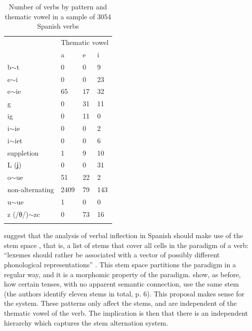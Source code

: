 \begin{table}
  \centering
  \begin{tabular}{llll}
    \lsptoprule
                    & \multicolumn{3}{c}{Thematic vowel} \\
                    & a    & e  & i                      \\
    \midrule
    b$\sim$t       & 0    & 0  & 9                      \\
    e$\sim$i        & 0    & 0  & 23                     \\
    e$\sim$ie       & 65   & 17 & 32                     \\
    g               & 0    & 31 & 11                     \\
    ig              & 0    & 11 & 0                      \\
    i$\sim$ie       & 0    & 0  & 2                      \\
    i$\sim$iet      & 0    & 0  & 6                      \\
    suppletion      & 1    & 9  & 10                     \\
    L (ʝ)           & 0    & 0  & 31                     \\
    o$\sim$ue       & 51   & 22 & 2                      \\
    non-alternating & 2409 & 79 & 143                    \\
    u$\sim$ue       & 1    & 0  & 0                      \\
    z (/θ/)$\sim$zc & 0    & 73 & 16                     \\
    \lspbottomrule
  \end{tabular}\caption{Number of verbs by pattern and thematic vowel in a sample of 3054 Spanish verbs}\label{tab:sp-verb-minor-cross}
\end{table}

\textcite{Boye.2006} suggest that the analysis of verbal inflection in Spanish should make use of the stem space \autocite{Bonami.2003}, that is, a list of stems that cover all cells in the paradigm of a verb: ``lexemes  should  rather  be  associated  with  a  vector  of  possibly  different phonological  representations'' \autocite{Bonami.2006}. This stem space partitions the paradigm in a regular way, and it is a morphomic property of the paradigm. \textcite{Boye.2006} show, as \textcite{Maiden.2001} before, how certain tenses, with no apparent semantic connection, use the same stem (the authors identify eleven stems in total, p. 6). This proposal makes sense for the system. These patterns only affect the stems, and are independent of the thematic vowel of the verb. The implication is then that there is an independent hierarchy which captures the stem alternation system.

